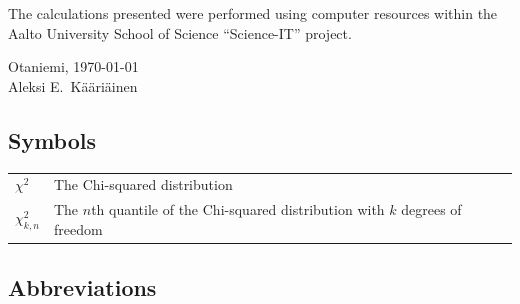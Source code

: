 \documentclass[english, 12pt, a4paper, sci, utf8, a-2b, online]{latex/definitions/aaltothesis}
\begin{document}


\dothesispagenumbering{}

The calculations presented were performed using computer resources within the Aalto University School of Science “Science-IT” project.

\vspace*{\fill}
Otaniemi, \today \\

\vspace{5mm}
{\hfill Aleksi E.\ Kääriäinen \hspace{1cm}}

\newpage


\thesistableofcontents



\subsection*{Symbols}

\begin{tabular}{ll}
$\chi^2$  & The Chi-squared distribution \\
$\chi^2_{k, n}$ & The $n$th quantile of the Chi-squared distribution with $k$ degrees of freedom \\
\end{tabular}

\subsection*{Abbreviations}
\end{document}
